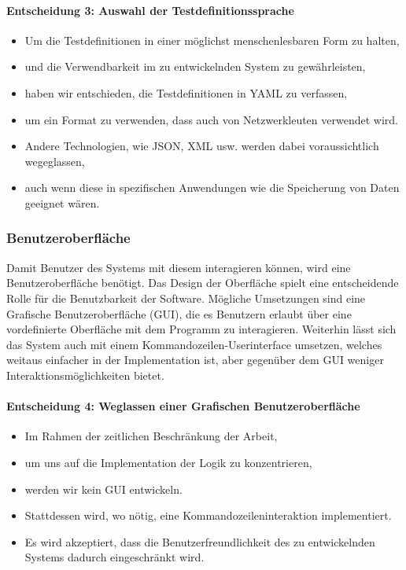 \documentclass[
	ngerman,
	toc=listof, %
	toc=bibliography, %
	footnotes=multiple, %
	parskip=half, %
	numbers=noendperiod %
]{scrartcl}
\begin{document}
		\paragraph{Entscheidung 3: Auswahl der Testdefinitionssprache}
		\begin{itemize}
			\item Um die Testdefinitionen in einer möglichst menschenlesbaren Form zu halten,
			\item und die Verwendbarkeit im zu entwickelnden System zu gewährleisten,
			\item haben wir entschieden, die Testdefinitionen in YAML zu verfassen,
			\item um ein Format zu verwenden, dass auch von Netzwerkleuten verwendet wird.
			\item Andere Technologien, wie JSON, XML usw. werden dabei voraussichtlich wegeglassen,
			\item auch wenn diese in spezifischen Anwendungen wie die Speicherung von Daten geeignet wären.
		\end{itemize}
		\newpage

		\subsubsection{Benutzeroberfläche}
		Damit Benutzer des Systems mit diesem interagieren können, wird eine Benutzeroberfläche benötigt.
		Das Design der Oberfläche spielt eine entscheidende Rolle für die Benutzbarkeit der Software. 
		Mögliche Umsetzungen sind eine Grafische Benutzeroberfläche (GUI), die es Benutzern erlaubt über eine vordefinierte Oberfläche mit dem Programm zu interagieren.
		Weiterhin lässt sich das System auch mit einem Kommandozeilen-Userinterface umsetzen, welches weitaus einfacher in der Implementation ist, aber gegenüber dem GUI weniger Interaktionsmöglichkeiten bietet.

		\paragraph{Entscheidung 4: Weglassen einer Grafischen Benutzeroberfläche}
		\begin{itemize}
			\item Im Rahmen der zeitlichen Beschränkung der Arbeit,
			\item um uns auf die Implementation der Logik zu konzentrieren,
			\item werden wir kein GUI entwickeln.
			\item Stattdessen wird, wo nötig, eine Kommandozeileninteraktion implementiert.
			\item Es wird akzeptiert, dass die Benutzerfreundlichkeit des zu entwickelnden Systems dadurch eingeschränkt wird.
		\end{itemize}
\end{document}
